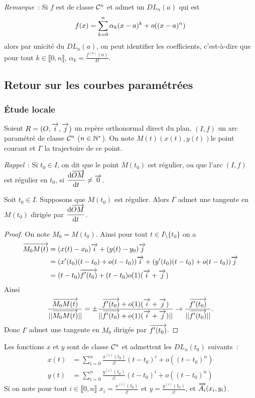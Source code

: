 \emph{Remarque}~: Si $f$ est de classe $\mathcal{C}^{n}$ et admet un $DL_n(a)$  qui est
\begin{equation}
  f(x) = \sum_{k=0}^n \alpha_k(x-a)^k +o\mathopen{}\left((x-a)^n\right)
\end{equation}
alors par unicité du $DL_n(a)$, on peut identifier les coefficients, c'est-à-dire que pour tout $k \in \llbracket 0,n \rrbracket$, $\alpha_k = \frac{f^{(k)}(a)}{k!}$.

\subsection{Retour sur les courbes paramétrées}

\subsubsection{Étude locale}

Soient $R=(O,\overrightarrow{i},\overrightarrow{j})$ un repère orthonormal direct du plan, $(I,f)$ un arc paramétré de classe $\mathcal{C}^{n}$ ($n \in \mathbb{N}^*$). On note $M(t)(x(t),y(t))$le point courant et $\Gamma$ la trajectoire de ce point.

\emph{Rappel}~: Si $t_0 \in I$, on dit que le point $M(t_0)$ est régulier, ou que l'arc $(I,f)$ est régulier en $t_0$, si $\dfrac{\mathrm{d} \overrightarrow{OM}}{\mathrm{d} t} \neq \overrightarrow{0}$.

\begin{prop}
  Soit $t_0 \in I$. Supposons que $M(t_0)$ est régulier. Alors $\Gamma$ admet une tangente en $M(t_0)$ dirigée par $\dfrac{\mathrm{d} \overrightarrow{OM}}{\mathrm{d} t}$.
\end{prop}
\begin{proof}
  On note $M_0=M(t_0)$. Ainsi pour tout $t \in I\setminus\{t_0\}$ on a
  \begin{align}
    \overrightarrow{M_0M(t)} &= (x(t)-x_0)\overrightarrow{i} + (y(t)-y_0)\overrightarrow{j} \\
    &= (x'(t_0)(t-t_0) +o(t-t_0))\overrightarrow{i} + (y'(t_0)(t-t_0) +o(t-t_0))\overrightarrow{j}\\
    &=(t-t_0)\overrightarrow{f'(t_0)} +(t-t_0)o(1)(\overrightarrow{i}+\overrightarrow{j})
  \end{align}
  Ainsi
  \begin{equation}
    \frac{\overrightarrow{M_0M(t)}}{||\overrightarrow{M_0M(t)}||} = \pm \frac{\overrightarrow{f'(t_0)} +o(1)(\overrightarrow{i}+\overrightarrow{j})}{||\overrightarrow{f'(t_0)} +o(1)(\overrightarrow{i}+\overrightarrow{j})||} \to \frac{\overrightarrow{f'(t_0)}}{||\overrightarrow{f'(t_0)}||}.
  \end{equation}
  Donc $\Gamma$ admet une tangente en $M_0$ dirigée par $\overrightarrow{f'(t_0)}$.
\end{proof}

Les fonctions $x$ et $y$ sont de classe $\mathcal{C}^{n}$ et admettent les $DL_n(t_0)$ suivants~:
\begin{align}
  x(t) &= \sum_{i=0}^n \frac{x^{(i)}(t_0)}{i!} (t-t_0)^i + o((t-t_0)^n) \\
  y(t) &= \sum_{i=0}^n \frac{y^{(i)}(t_0)}{i!} (t-t_0)^i + o((t-t_0)^n) 
\end{align}
Si on note pour tout $i \in \llbracket 0,n \rrbracket$ $x_i=\frac{x^{(i)}(t_0)}{i!}$ et $y=\frac{y^{(i)}(t_0)}{i!}$, et $\overrightarrow{A_i}(x_i,y_i)$.

